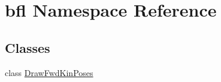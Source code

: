 \hypertarget{namespacebfl}{}\section{bfl Namespace Reference}
\label{namespacebfl}
\subsection*{Classes}
\begin{DoxyCompactItemize}
\item 
class \hyperlink{classbfl_1_1DrawFwdKinPoses}{Draw\+Fwd\+Kin\+Poses}
\end{DoxyCompactItemize}
